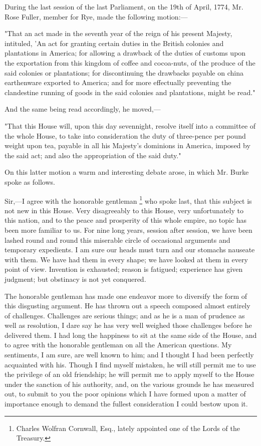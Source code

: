 \begin{itpars}
During the last session of the last Parliament, on the 19th of April, 1774, Mr. Rose Fuller, member for Rye, made the following motion:—

"That an act made in the seventh year of the reign of his present Majesty, intituled, 'An act for granting certain duties in the British colonies and plantations in America; for allowing a drawback of the duties of customs upon the exportation from this kingdom of coffee and cocoa-nuts, of the produce of the said colonies or plantations; for discontinuing the drawbacks payable on china earthenware exported to America; and for more effectually preventing the clandestine running of goods in the said colonies and plantations, might be read."

And the same being read accordingly, he moved,—

"That this House will, upon this day sevennight, resolve itself into a committee of the whole House, to take into consideration the duty of three-pence per pound weight upon tea, payable in all his Majesty's dominions in America, imposed by the said act; and also the appropriation of the said duty."

On this latter motion a warm and interesting debate arose, in which Mr. Burke spoke as follows.
\end{itpars}

\vspace{0.3cm}

Sir,—I agree with the honorable gentleman
\footnote{Charles Wolfran Cornwall, Esq., lately appointed one of the Lords of the Treasury.}
who spoke last, that this subject is not new in this House. Very disagreeably to this House, very unfortunately to this nation, and to the peace and prosperity of this whole empire, no topic has been more familiar to us. For nine long years, session after session, we have been lashed round and round this miserable circle of occasional arguments and temporary expedients. I am sure our heads must turn and our stomachs nauseate with them. We have had them in every shape; we have looked at them in every point of view. Invention is exhausted; reason is fatigued; experience has given judgment; but obstinacy is not yet conquered.

The honorable gentleman has made one endeavor more to diversify the form of this disgusting argument. He has thrown out a speech composed almost entirely of challenges. Challenges are serious things; and as he is a man of prudence as well as resolution, I dare say he has very well weighed those challenges before he delivered them. I had long the happiness to sit at the same side of the House, and to agree with the honorable gentleman on all the American questions. My sentiments, I am sure, are well known to him; and I thought I had been perfectly acquainted with his. Though I find myself mistaken, he will still permit me to use the privilege of an old friendship; he will permit me to apply myself to the House under the sanction of his authority, and, on the various grounds he has measured out, to submit to you the poor opinions which I have formed upon a matter of importance enough to demand the fullest consideration I could bestow upon it.

